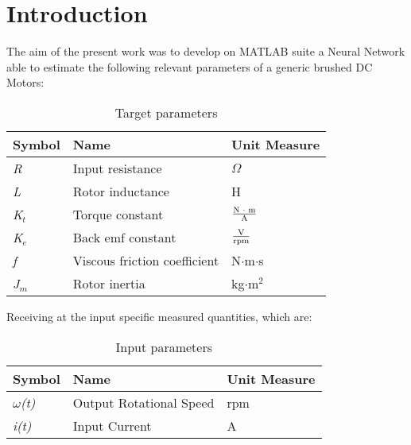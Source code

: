 


\newpage

\section{\textbf{Introduction}}

The aim of the present work was to develop on MATLAB suite a Neural Network able to estimate the following relevant parameters of a generic brushed DC Motors:

\begin{table}[h!] %
\centering	
\renewcommand{\arraystretch}{1.5} 
\begin{tabular}{| l l l |} 
 \hline
 Symbol & Name & Unit Measure \\ [0.5ex]  
 \hline\hline
	\textit{R} & Input resistance & $\Omega$\\ 
	\textit{L} & Rotor inductance & H\\
	\textit{K$_{t}$} & Torque constant & $\frac{\text{N $\cdot$ m}}{\text{A}}$\\
	\textit{K$_{e}$} & Back emf constant & $\frac{\text{V}}{\text{rpm}} $\\
	\textit{f} & Viscous friction coefficient & N$\cdot$m$\cdot$s\\
	\textit{J$_{m}$} & Rotor inertia & kg$\cdot$m$^2$\\
 \hline
\end{tabular}
\caption{Target parameters}
\label{table:targetprm}
\end{table}

Receiving at the input specific measured quantities, which are:

\begin{table}[h!] %
\centering	
\renewcommand{\arraystretch}{1.5} 
\begin{tabular}{| l l l |} 
 \hline
 Symbol & Name & Unit Measure \\ [0.5ex]  
 \hline\hline
	\textit{$\omega$(t)} & Output Rotational Speed & rpm\\ 
	\textit{i(t)} & Input Current & A\\
 \hline
\end{tabular}
\caption{Input parameters}
\label{table:inputprm}
\end{table}

